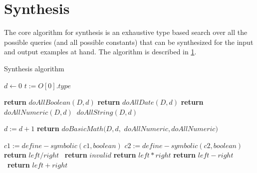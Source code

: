 \section{Synthesis}\label{synthesis}
The core algorithm for synthesis is an exhaustive type based search over all the possible queries (and all possible constants) that can be synthesized for the input and output examples at hand.  The algorithm is described in \ref{synthesis}.

\begin{algorithm}
\caption{Synthesis algorithm}
\label{synthesis}
\begin{algorithmic}[1]

\Statex
{}
   \State $d\gets 0$
   \State $t := O[0].type$

      \textbf{return} $doAllBoolean(D, d)$
      \textbf{return} $doAllDate(D, d)$
      \textbf{return} $doAllNumeric(D, d)$
   \Else
     $\ doAllString(D, d)$
\EndIf
\EndProcedure

\Statex
{}
\State $ d := d + 1 $
  \textbf{return} $doBasicMath(D, d,$
\Statex $doAllNumeric, doAllNumeric)$
\Statex
\EndIf
\EndProcedure

\Statex
{}
\State $ c1 := define-symbolic(c1, boolean) $
\State $ c2 := define-symbolic(c2, boolean) $
  \textbf{return} $left/right$
 \Else
  \ \textbf{return} $invalid$
 \EndIf
{}
  \textbf{return} $left*right$
  \textbf{return} $left-right$
\Else
  \ \textbf{return} $left+right$
\EndIf
\EndProcedure


\end{algorithmic}
\end{algorithm}
